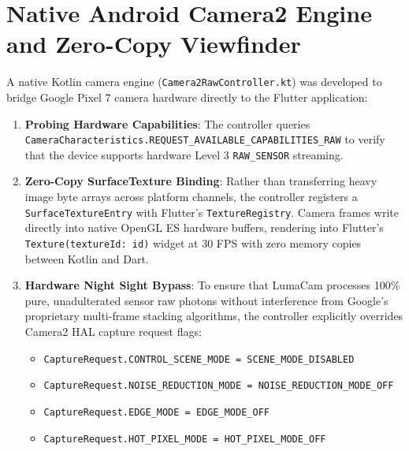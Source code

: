 \section{Native Android Camera2 Engine and Zero-Copy Viewfinder}
A native Kotlin camera engine (\texttt{Camera2RawController.kt}) was developed to bridge Google Pixel 7 camera hardware directly to the Flutter application:
\begin{enumerate}
    \item \textbf{Probing Hardware Capabilities}: The controller queries \texttt{CameraCharacteristics.REQUEST\_AVAILABLE\_CAPABILITIES\_RAW} to verify that the device supports hardware Level 3 \texttt{RAW\_SENSOR} streaming.
    \item \textbf{Zero-Copy SurfaceTexture Binding}: Rather than transferring heavy image byte arrays across platform channels, the controller registers a \texttt{SurfaceTextureEntry} with Flutter's \texttt{TextureRegistry}. Camera frames write directly into native OpenGL ES hardware buffers, rendering into Flutter's \texttt{Texture(textureId: id)} widget at 30 FPS with zero memory copies between Kotlin and Dart.
    \item \textbf{Hardware Night Sight Bypass}: To ensure that LumaCam processes 100\% pure, unadulterated sensor raw photons without interference from Google's proprietary multi-frame stacking algorithms, the controller explicitly overrides Camera2 HAL capture request flags:
    \begin{itemize}
        \item \texttt{CaptureRequest.CONTROL\_SCENE\_MODE = SCENE\_MODE\_DISABLED}
        \item \texttt{CaptureRequest.NOISE\_REDUCTION\_MODE = NOISE\_REDUCTION\_MODE\_OFF}
        \item \texttt{CaptureRequest.EDGE\_MODE = EDGE\_MODE\_OFF}
        \item \texttt{CaptureRequest.HOT\_PIXEL\_MODE = HOT\_PIXEL\_MODE\_OFF}
    \end{itemize}
\end{enumerate}

